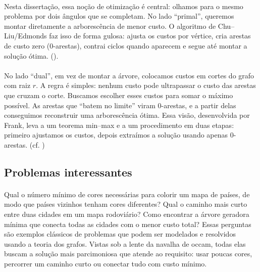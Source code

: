 \documentclass[12pt,a4paper]{article}
\begin{document}
\paragraph{}
Nesta dissertação, essa noção de otimização é central: olhamos para o mesmo problema por dois ângulos que se completam. No lado “primal”, queremos montar diretamente a arborescência de menor custo. O algoritmo de Chu–Liu/Edmonds faz isso de forma gulosa: ajusta os custos por vértice, cria arestas de custo zero (0-arestas), contrai ciclos quando aparecem e segue até montar a solução ótima.
(\cite{chu1965,edmonds1967optimum}).

\paragraph{}
No lado “dual”, em vez de montar a árvore, colocamos custos em cortes do grafo com raiz $r$. A regra é simples: nenhum custo pode ultrapassar o custo das arestas que cruzam o corte. Buscamos escolher esses custos para somar o máximo possível. As arestas que “batem no limite” viram 0-arestas, e a partir delas conseguimos reconstruir uma arborescência ótima. Essa visão, desenvolvida por Frank, leva a um teorema min–max e a um procedimento em duas etapas: primeiro ajustamos os custos, depois extraímos a solução usando apenas 0-arestas.
(cf. \cite{frank2014,schrijver2003comb})

\subsection{Problemas interessantes}

\paragraph{}
Qual o número mínimo de cores necessárias para colorir um mapa de países, de modo que países vizinhos tenham cores diferentes? Qual o caminho mais curto entre duas cidades em um mapa rodoviário? Como encontrar a árvore geradora mínima que conecta todas as cidades com o menor custo total? Essas perguntas são exemplos clássicos de problemas que podem ser modelados e resolvidos usando a teoria dos grafos. Vistas sob a lente da navalha de occam, todas elas buscam a solução mais parcimoniosa que atende ao requisito: usar poucas cores, percorrer um caminho curto ou conectar tudo com custo mínimo.
\end{document}
